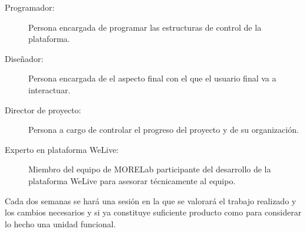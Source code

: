 \documentclass{DeustoFDP}
\begin{document}
\begin{description}
    \item[Programador:] Persona encargada de programar las estructuras de control de la plataforma.
    \item[Diseñador:] Persona encargada de el aspecto final con el que el usuario final va a interactuar.
    \item[Director de proyecto:] Persona a cargo de controlar el progreso del proyecto y de su organización.
    \item[Experto en plataforma WeLive:] Miembro del equipo de MORELab participante del desarrollo de la plataforma WeLive para asesorar técnicamente al equipo.
\end{description}

Cada dos semanas se hará una sesión en la que se valorará el trabajo realizado y los cambios necesarios y si ya constituye suficiente producto como para considerar lo hecho una unidad funcional.
\end{document}
